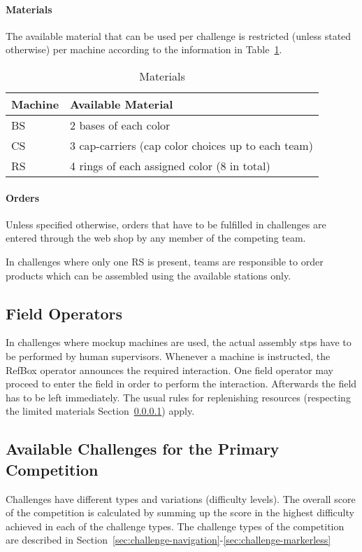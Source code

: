 \documentclass[12pt,twoside]{article}
\newcommand{\refsec}[1]{Section~\ref{#1}}
\newcommand{\reftab}[1]{Table~\ref{#1}}
\begin{document}
\paragraph{Materials}\label{sec:materials}
The available material that can be used per challenge is restricted
(unless stated otherwise) per machine according to the information in
\reftab{tab:materials}.
\begin{table}[!htb]
    \centering
        \begin{tabularx}{\linewidth}{l|l}
					Machine & Available Material  \\\hline
					\ac{BS} & 2 bases of each color \\
					\ac{CS} & 3 cap-carriers (cap color choices up to each team)  \\
					\ac{RS} & 4 rings of each assigned color (8 in total)  \\
        \end{tabularx}
    \caption{Materials}
    \label{tab:materials}
\end{table}

\paragraph{Orders}
Unless specified otherwise, orders that have to be fulfilled in challenges
are entered through the web shop  by any member of the
competing team.

In challenges where only one \ac{RS} is present, teams are responsible to
order products which can be assembled using the available stations only.

\subsection{Field Operators}\label{sec:operators}
In challenges where mockup machines are used, the actual assembly stps have
to be performed by human supervisors. Whenever a machine is instructed,
the RefBox operator announces the required interaction. One field operator may
proceed to enter the field in order to perform the interaction. Afterwards the
field has to be left immediately.
The usual rules for replenishing resources (respecting the limited materials
\refsec{sec:materials}) apply.


\subsection{Available Challenges for the Primary Competition}
Challenges have different types and variations (difficulty levels).
The overall score of the competition is calculated by summing up the score
in the highest difficulty achieved in each of the challenge types.
The challenge types of the competition are described in
\refsec{sec:challenge-navigation}-\ref{sec:challenge-markerless}
\end{document}
